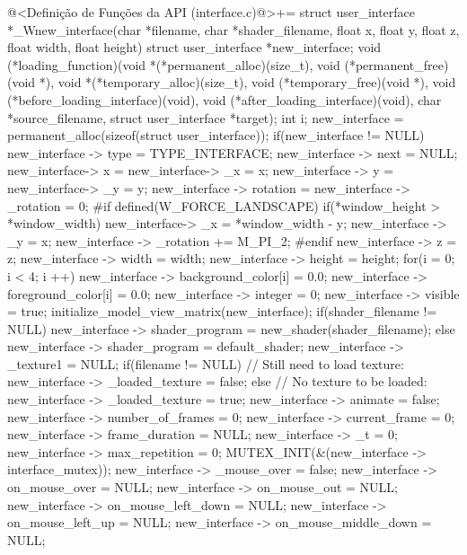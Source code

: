 \iniciocodigo
@<Definição de Funções da API (interface.c)@>+=
struct user_interface *_Wnew_interface(char *filename, char *shader_filename,
                                  float x, float y, float z, float width,
                                  float height){
  struct user_interface *new_interface;
  void (*loading_function)(void *(*permanent_alloc)(size_t),
                           void (*permanent_free)(void *),
                           void *(*temporary_alloc)(size_t),
                           void (*temporary_free)(void *),
                           void (*before_loading_interface)(void),
                           void (*after_loading_interface)(void),
                           char *source_filename, struct user_interface *target);
  int i;
  new_interface = permanent_alloc(sizeof(struct user_interface));
  if(new_interface != NULL){
    new_interface -> type = TYPE_INTERFACE;
    new_interface -> next = NULL;
    new_interface-> x = new_interface-> _x = x;
    new_interface -> y = new_interface-> _y = y;
    new_interface -> rotation = new_interface -> _rotation = 0;
#if defined(W_FORCE_LANDSCAPE)
   if(*window_height > *window_width){
      new_interface-> _x = *window_width - y;
      new_interface -> _y = x;
      new_interface -> _rotation += M_PI_2;
   }
#endif
    new_interface -> z = z;
    new_interface -> width = width;
    new_interface -> height = height;
    for(i = 0; i < 4; i ++){
      new_interface -> background_color[i] = 0.0;
      new_interface -> foreground_color[i] = 0.0;
    }
    new_interface -> integer = 0;
    new_interface -> visible = true;
    initialize_model_view_matrix(new_interface);
    if(shader_filename != NULL)
      new_interface -> shader_program = new_shader(shader_filename);
    else
      new_interface -> shader_program = default_shader;
    new_interface -> _texture1 = NULL;
    if(filename != NULL) // Still need to load texture:
      new_interface -> _loaded_texture = false;
    else // No texture to be loaded:
      new_interface -> _loaded_texture = true;
    new_interface -> animate = false;
    new_interface -> number_of_frames = 0;
    new_interface -> current_frame = 0;
    new_interface -> frame_duration = NULL;
    new_interface -> _t = 0;
    new_interface -> max_repetition = 0;
    MUTEX_INIT(&(new_interface -> interface_mutex));
    new_interface -> _mouse_over = false;
    new_interface -> on_mouse_over = NULL;
    new_interface -> on_mouse_out = NULL;
    new_interface -> on_mouse_left_down = NULL;
    new_interface -> on_mouse_left_up = NULL;
    new_interface -> on_mouse_middle_down = NULL;
}}
